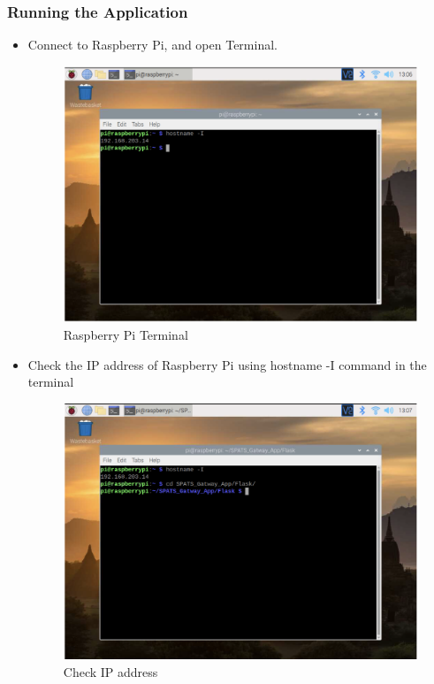 \documentclass[10pt]{article}
\begin{document}
\subsubsection{Running the Application}
\begin{itemize}
    \item Connect to Raspberry Pi, and open Terminal. 
    \begin{figure}[H]
    \begin{center}
        \includegraphics[width=0.7\linewidth, frame]{CA2-template/CM29.png}
       \caption{Raspberry Pi Terminal \label{fig:19}}
    \end{center}
\end{figure}

\item Check the IP address of Raspberry Pi using hostname -I command in the terminal
\begin{figure}[H]
    \begin{center}
        \includegraphics[width=0.7\linewidth, frame]{CA2-template/CM30.png}
       \caption{Check IP address \label{fig:20}}
    \end{center}
\end{figure}


\end{itemize}
\end{document}
